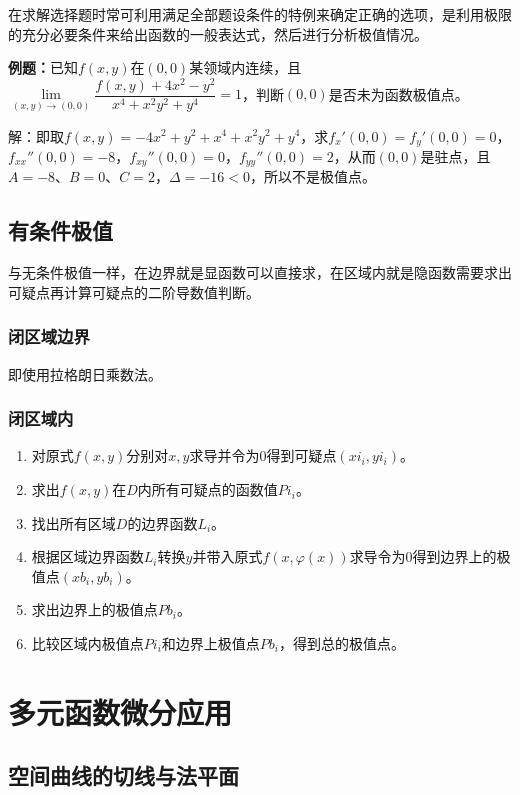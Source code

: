 \documentclass[UTF8, 12pt]{ctexart}
\begin{document}
在求解选择题时常可利用满足全部题设条件的特例来确定正确的选项，是利用极限的充分必要条件来给出函数的一般表达式，然后进行分析极值情况。

\textbf{例题：}已知$f(x,y)$在$(0,0)$某领域内连续，且$\lim\limits_{(x,y)\to(0,0)}\dfrac{f(x,y)+4x^2-y^2}{x^4+x^2y^2+y^4}=1$，判断$(0,0)$是否未为函数极值点。

解：即取$f(x,y)=-4x^2+y^2+x^4+x^2y^2+y^4$，求$f_x'(0,0)=f_y'(0,0)=0$，$f_{xx}''(0,0)=-8$，$f_{xy}''(0,0)=0$，$f_{yy}''(0,0)=2$，从而$(0,0)$是驻点，且$A=-8$、$B=0$、$C=2$，$\Delta=-16<0$，所以不是极值点。

\subsection{有条件极值}

与无条件极值一样，在边界就是显函数可以直接求，在区域内就是隐函数需要求出可疑点再计算可疑点的二阶导数值判断。

\subsubsection{闭区域边界}

即使用拉格朗日乘数法。

\subsubsection{闭区域内}

\begin{enumerate}
    \item 对原式$f(x,y)$分别对$x,y$求导并令为0得到可疑点$(xi_i,yi_i)$。
    \item 求出$f(x,y)$在$D$内所有可疑点的函数值$Pi_i$。
    \item 找出所有区域$D$的边界函数$L_i$。
    \item 根据区域边界函数$L_i$转换$y$并带入原式$f(x,\varphi(x))$求导令为0得到边界上的极值点$(xb_i,yb_i)$。
    \item 求出边界上的极值点$Pb_i$。
    \item 比较区域内极值点$Pi_i$和边界上极值点$Pb_i$，得到总的极值点。
\end{enumerate}

\section{多元函数微分应用}

\subsection{空间曲线的切线与法平面}
\end{document}
